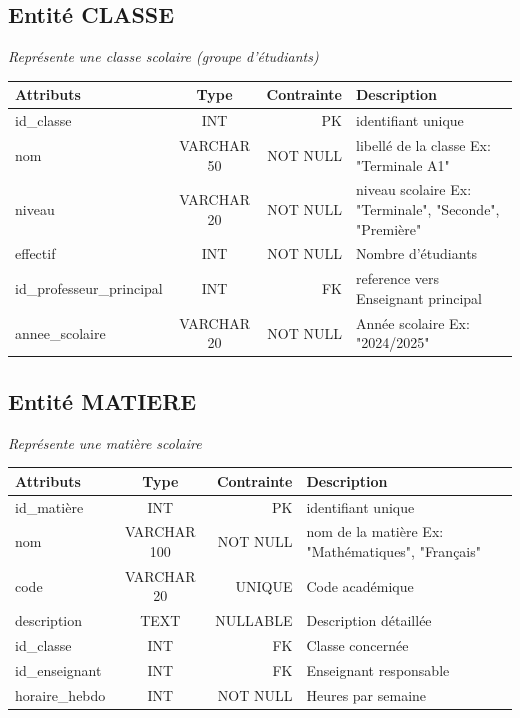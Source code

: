 \subsection{Entité CLASSE}

\textit{Représente une classe scolaire (groupe d'étudiants)}
\begin{center}
    \begin{tabular}{|l|c|r|p{8cm}|}
  \hline
   \textbf{Attributs} & \textbf{Type} & \textbf{Contrainte} & \textbf{Description}\\
  \hline
  id\_classe & INT & PK & identifiant unique \\
  \hline
  nom & VARCHAR 50 & NOT NULL & libellé de la classe Ex: "Terminale A1" \\
  \hline
  niveau & VARCHAR 20 & NOT NULL & niveau scolaire Ex: "Terminale", "Seconde", "Première" \\
  \hline
  effectif & INT & NOT NULL & Nombre d'étudiants \\
  \hline
  id\_professeur\_principal & INT &  FK & reference vers Enseignant principal \\
  \hline
  annee\_scolaire & VARCHAR 20 & NOT NULL & Année scolaire Ex: "2024/2025" \\
  \hline
\end{tabular}
\end{center}

\subsection{Entité MATIERE}

\textit{Représente une matière scolaire}
\begin{center}
    \begin{tabular}{|l|c|r|p{8cm}|}
  \hline
  \textbf{Attributs} & \textbf{Type} & \textbf{Contrainte} & \textbf{Description}\\
  \hline
  id\_matière & INT & PK & identifiant unique \\
  \hline
  nom & VARCHAR 100 & NOT NULL & nom de la matière Ex: "Mathématiques", "Français" \\
  \hline
  code & VARCHAR 20 & UNIQUE &  Code académique\\
  \hline
  description & TEXT & NULLABLE & Description détaillée \\
  \hline
  id\_classe & INT & FK & Classe concernée \\
  \hline
  id\_enseignant & INT & FK & Enseignant responsable \\
  \hline
  horaire\_hebdo & INT & NOT NULL & Heures par semaine \\
  \hline
\end{tabular}
\end{center}

